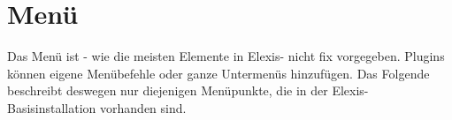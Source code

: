 

\section{Menü}
Das Menü ist - wie die meisten Elemente in Elexis- nicht fix vorgegeben. Plugins
können eigene Menübefehle oder ganze Untermenüs hinzufügen.
Das Folgende beschreibt deswegen nur diejenigen Menüpunkte, die in der
Elexis-Basisinstallation vorhanden sind.
